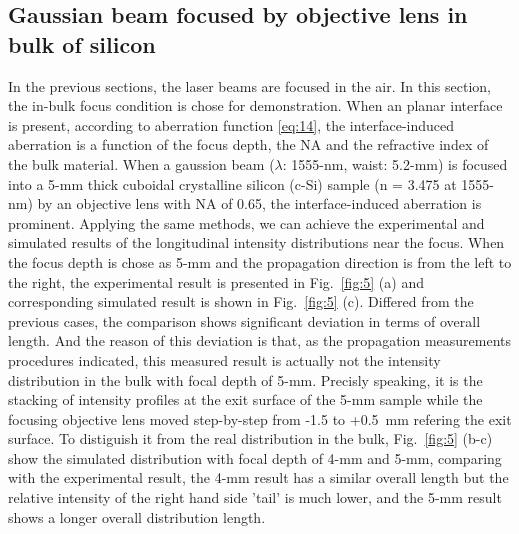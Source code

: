 \documentclass[9pt,twocolumn,twoside]{osajnl}
\begin{document}
\subsection{Gaussian beam focused by objective lens in bulk of silicon}
In the previous sections, the laser beams are focused in the air. In this section, the in-bulk focus condition is chose for demonstration. When an planar interface is present, according to aberration function \eqref{eq:14}, the interface-induced aberration is a function of the focus depth, the NA and the refractive index of the bulk material. When a gaussion beam ($\lambda$: 1555-nm, waist: 5.2-mm) is focused into a 5-mm thick cuboidal crystalline silicon (c-Si) sample (n = 3.475 at 1555-nm) by an objective lens with NA of 0.65, the interface-induced aberration is prominent. Applying the same methods, we can achieve the experimental and simulated results of the longitudinal intensity distributions near the focus. When the focus depth is chose as 5-mm and the propagation direction is from the left to the right, the experimental result is presented in Fig.~\ref{fig:5} (a) and corresponding simulated result is shown in Fig.~\ref{fig:5} (c). Differed from the previous cases, the comparison shows significant deviation in terms of overall length. And the reason of this deviation is that, as the propagation measurements procedures indicated, this measured result is actually not the intensity distribution in the bulk with focal depth of 5-mm. Precisly speaking, it is the stacking of intensity profiles at the exit surface of the 5-mm sample while the focusing objective lens moved step-by-step from -1.5 to +0.5~mm refering the exit surface. To distiguish it from the real distribution in the bulk, Fig.~\ref{fig:5} (b-c) show the simulated distribution with focal depth of 4-mm and 5-mm, comparing with the experimental result, the 4-mm result has a similar overall length but the relative intensity of the right hand side 'tail' is much lower, and the 5-mm result shows a longer overall distribution length.
\end{document}
